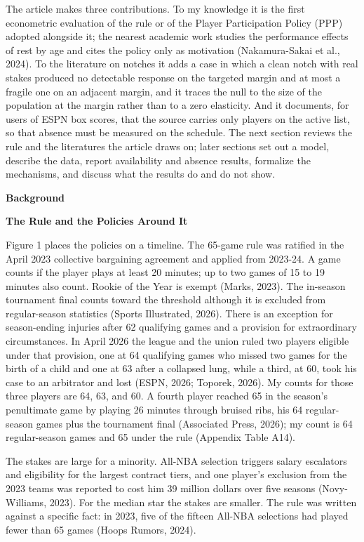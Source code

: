\documentclass[12pt]{article}
\newcommand{\lone}[1]{\par\medskip\noindent\begin{center}\textbf{#1}\end{center}\par\nopagebreak}
\newcommand{\ltwo}[1]{\par\medskip\noindent\textbf{#1}\par\nopagebreak}
\begin{document}
The article makes three contributions. To my knowledge it is the first econometric evaluation of the rule or of the Player Participation Policy (PPP) adopted alongside it; the nearest academic work studies the performance effects of rest by age and cites the policy only as motivation (Nakamura-Sakai et al., 2024). To the literature on notches it adds a case in which a clean notch with real stakes produced no detectable response on the targeted margin and at most a fragile one on an adjacent margin, and it traces the null to the size of the population at the margin rather than to a zero elasticity. And it documents, for users of ESPN box scores, that the source carries only players on the active list, so that absence must be measured on the schedule. The next section reviews the rule and the literatures the article draws on; later sections set out a model, describe the data, report availability and absence results, formalize the mechanisms, and discuss what the results do and do not show.


\lone{Background}



\ltwo{The Rule and the Policies Around It}


Figure 1 places the policies on a timeline. The 65-game rule was ratified in the April 2023 collective bargaining agreement and applied from 2023-24. A game counts if the player plays at least 20 minutes; up to two games of 15 to 19 minutes also count. Rookie of the Year is exempt (Marks, 2023). The in-season tournament final counts toward the threshold although it is excluded from regular-season statistics (Sports Illustrated, 2026). There is an exception for season-ending injuries after 62 qualifying games and a provision for extraordinary circumstances. In April 2026 the league and the union ruled two players eligible under that provision, one at 64 qualifying games who missed two games for the birth of a child and one at 63 after a collapsed lung, while a third, at 60, took his case to an arbitrator and lost (ESPN, 2026; Toporek, 2026). My counts for those three players are 64, 63, and 60. A fourth player reached 65 in the season's penultimate game by playing 26 minutes through bruised ribs, his 64 regular-season games plus the tournament final (Associated Press, 2026); my count is 64 regular-season games and 65 under the rule (Appendix Table A14).

The stakes are large for a minority. All-NBA selection triggers salary escalators and eligibility for the largest contract tiers, and one player's exclusion from the 2023 teams was reported to cost him 39 million dollars over five seasons (Novy-Williams, 2023). For the median star the stakes are smaller. The rule was written against a specific fact: in 2023, five of the fifteen All-NBA selections had played fewer than 65 games (Hoops Rumors, 2024).
\end{document}
